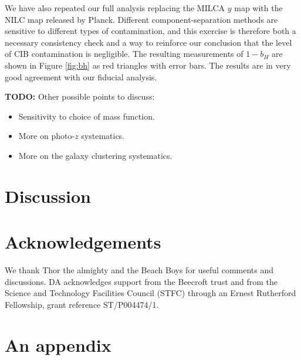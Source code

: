 \documentclass[useAMS,usenatbib]{mn2e}
\newcommand{\todo}[1]{{\bf TODO:} #1}
\begin{document}
      We have also repeated our full analysis replacing the MILCA $y$ map with the NILC map released by Planck. Different component-separation methods are sensitive to different types of contamination, and this exercise is therefore both a necessary consistency check and a way to reinforce our conclusion that the level of CIB contamination is negligible. The resulting measurements of $1-b_H$ are shown in Figure \ref{fig:bh} as red triangles with error bars. The results are in very good agreement with our fiducial analysis.

      
      \todo{Other possible points to discuss:
      \begin{itemize}
       \item Sensitivity to choice of mass function.
       \item More on photo-$z$ systematics.
       \item More on the galaxy clustering systematics.
      \end{itemize}
      }



\section{Discussion}\label{sec:discussion}
  \lipsum[2]

\section*{Acknowledgements}
  We thank Thor the almighty and the Beach Boys for useful comments and discussions. DA acknowledges support from the Beecroft trust and from the Science and Technology Facilities Council (STFC) through an Ernest Rutherford Fellowship, grant reference ST/P004474/1.
  
\setlength{\bibhang}{2.0em}
\setlength{}


\appendix
\section{An appendix}\label{app:app}
  \lipsum[3]
\end{document}
